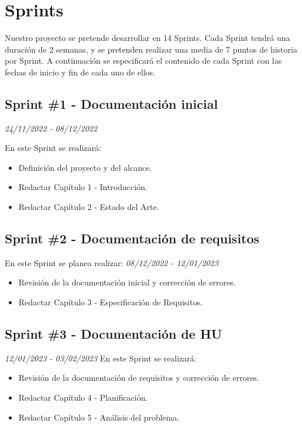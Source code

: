 \section{Sprints}
Nuestro proyecto se pretende desarrollar en 14 Sprints. Cada Sprint tendrá una duración de 2 semanas, y se pretenden realizar una media 
de 7 puntos de historia por Sprint. A continuación se especificará el contenido de cada Sprint con las fechas de inicio y fin de cada uno de ellos.

\subsection{Sprint \#1 - Documentación inicial}
\textit{24/11/2022   -   08/12/2022}

En este Sprint se realizará:
\begin{itemize}

    \item Definición del proyecto y del alcance.
    \item Redactar Capítulo 1 - Introducción.
    \item Redactar Capítulo 2 - Estado del Arte.
\end{itemize}
\subsection{Sprint \#2 - Documentación de requisitos}
En este Sprint se planea realizar:
\textit{08/12/2022   -   12/01/2023}
\begin{itemize}
    \item Revisión de la documentación inicial y corrección de errores.
    \item Redactar Capítulo 3 - Especificación de Requisitos.
\end{itemize}

\subsection{Sprint \#3 - Documentación de HU}
\textit{12/01/2023   -   03/02/2023}
En este Sprint se realizará:
\begin{itemize}
    \item Revisión de la documentación de requisitos y corrección de errores.
    \item Redactar Capítulo 4 - Planificación.
    \item Redactar Capítulo 5 - Análisis del problema.
\end{itemize}

